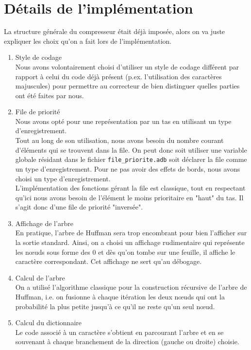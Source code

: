 \documentclass[a4paper,11pt]{article}
\begin{document}
\section{Détails de l'implémentation}
	La structure générale du compresseur était déjà imposée, alors on va juste expliquer les choix qu'on a fait lors de l'implémentation.
	\begin{enumerate}
		\item{Style de codage}\\
			Nous avons volontairement choisi d'utiliser un style de codage différent par rapport à celui du code déjà présent (p.ex. l'utilisation des caractères majuscules) pour permettre au correcteur de bien distinguer quelles parties ont été faites par nous.
		\item{File de priorité}\\
			Nous avons opté pour une représentation par un tas en utilisant un type d'enregistrement. \\
			Tout au long de son utilisation, nous avons besoin du nombre courant d'éléments qui se trouvent dans la file. On peut donc soit utiliser une variable globale résidant dans le fichier \verb+file_priorite.adb+ soit déclarer la file comme un type d'enregistrement. Pour ne pas avoir des effets de bords, nous avons choisi un type d'enregistrement.\\
			L'implémentation des fonctions gérant la file est classique, tout en respectant qu'ici nous avons besoin de l'élément le moins prioritaire en "haut" du tas. Il s'agit donc d'une file de priorité "inversée".
		\item{Affichage de l'arbre}\\
			En pratique, l'arbre de Huffman sera trop encombrant pour bien l'afficher sur la sortie standard. Ainsi, on a choisi un affichage rudimentaire qui représente les n\oe{}uds sous forme des $0$ et dès qu'on tombe sur une feuille, il affiche le caractère correspondant. Cet affichage ne sert qu'au débogage.
		\item{Calcul de l'arbre}\\
			On a utilisé l'algorithme classique pour la construction récursive de l'arbre de Huffman, i.e. on fusionne à chaque itération les deux n\oe{}uds qui ont la probabilité la plus petite jusqu'à ce qu'il ne reste qu'un seul n\oe{}ud.
		\item{Calcul du dictionnaire}\\
			Le code associé à un caractère s'obtient en parcourant l'arbre et en se souvenant à chaque branchement de la direction (gauche ou droite) choisie.\\

\end{enumerate}
\end{document}
